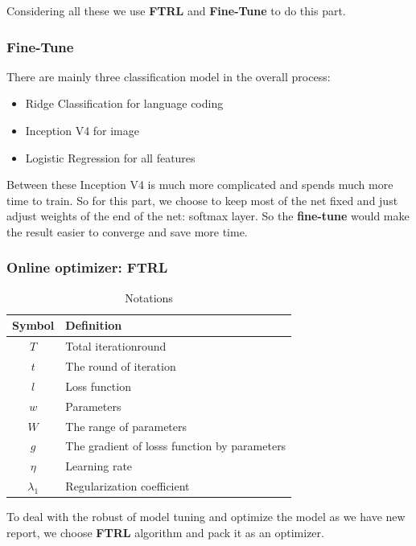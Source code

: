 \documentclass[12pt]{article}
\begin{document}
Considering all these we use \textbf{FTRL} and \textbf{Fine-Tune} to do this part.
 
\subsubsection{Fine-Tune}
There are mainly three classification model in the overall process:
\begin{itemize}
	\item Ridge Classification for language coding
	\item Inception V4 for image
	\item Logistic Regression for all features
\end{itemize}

Between these Inception V4 is much more complicated and spends much more time to train.  So for this part, we choose to keep most of the net fixed and just adjust weights of the end of the net: softmax layer. So the \textbf{fine-tune} would make the result easier to converge and save more time.

\subsubsection{Online optimizer: FTRL}
\begin{table}[H]
	\begin{center}
		\caption{Notations}
		\begin{tabular}{cl}
			\toprule
			\multicolumn{1}{m{3cm}}{\centering Symbol}
			&\multicolumn{1}{m{8cm}}{\centering Definition}\\
			\midrule
			$T$& Total iterationround\\
			$t$& The round of iteration \\
			$l$&Loss function\\
			$w$&Parameters\\
			$W$&The range of parameters\\
			$g$& The gradient of losss function by parameters\\
			$\eta$&Learning rate\\
			$\lambda_1$&Regularization coefficient\\
			\bottomrule
		\end{tabular}\label{Ntt}
	\end{center}
\end{table}
To deal with the robust of model tuning and optimize the model as we have new report, we choose \textbf{FTRL}  algorithm and pack it as an optimizer.
\end{document}
